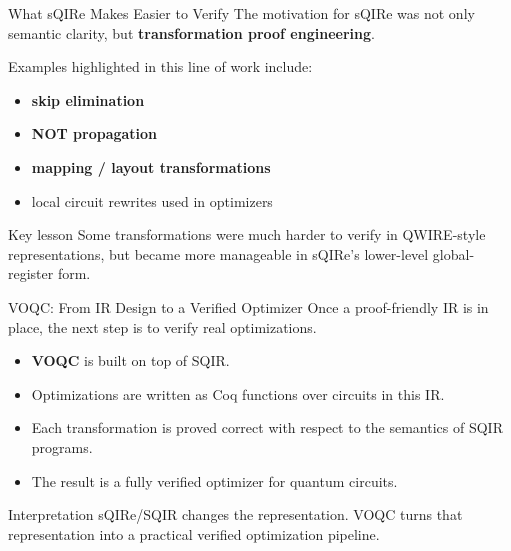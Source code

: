\documentclass[aspectratio=169]{beamer}
\begin{document}
\begin{frame}{What sQIRe Makes Easier to Verify}
\justifying
The motivation for sQIRe was not only semantic clarity, but \textbf{transformation proof engineering}.

\vspace{0.7em}
Examples highlighted in this line of work include:
\begin{itemize}
    \item \textbf{skip elimination}
    \item \textbf{NOT propagation}
    \item \textbf{mapping / layout transformations}
    \item local circuit rewrites used in optimizers
\end{itemize}

\vspace{0.7em}
\begin{alertblock}{Key lesson}
Some transformations were much harder to verify in QWIRE-style representations, but became more manageable in sQIRe's lower-level global-register form.
\end{alertblock}
\end{frame}
\begin{frame}{VOQC: From IR Design to a Verified Optimizer}
\justifying
Once a proof-friendly IR is in place, the next step is to verify real optimizations.

\vspace{0.7em}
\begin{itemize}
    \item \textbf{VOQC} is built on top of SQIR.
    \item Optimizations are written as Coq functions over circuits in this IR.
    \item Each transformation is proved correct with respect to the semantics of SQIR programs.
    \item The result is a fully verified optimizer for quantum circuits.
\end{itemize}

\vspace{0.7em}
\begin{block}{Interpretation}
sQIRe/SQIR changes the representation.  
VOQC turns that representation into a practical verified optimization pipeline.
\end{block}
\end{frame}
\end{document}
